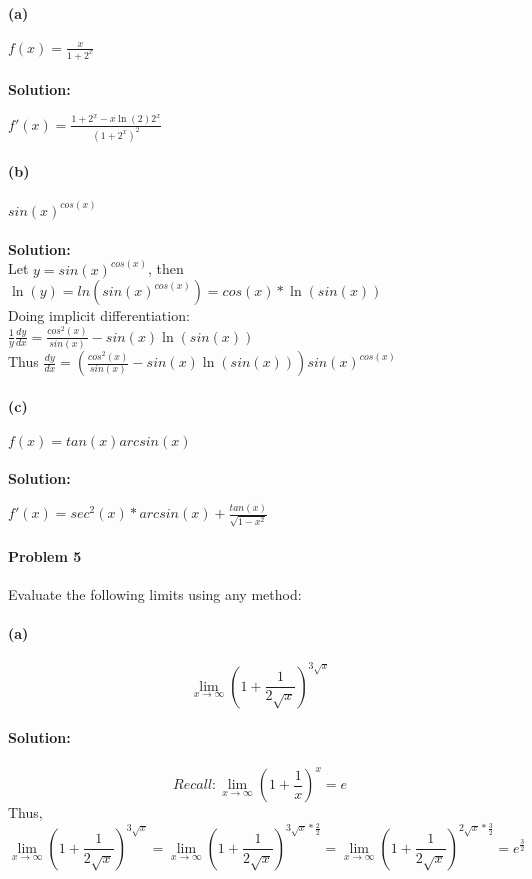 \documentclass[a4paper,11pt]{article}
\begin{document}
\paragraph{(a)}
$f(x) = \frac{x}{1+2^x}$ \\ \\
\textbf{Solution:}
\begin{center}$f ' (x) = \frac{1+2^x - x\ln(2)2^x}{(1+2^x)^2}$\end{center}

\paragraph{(b)} $sin(x)^{cos(x)}$ \\ \\
\textbf{Solution:} \\
Let $y = sin(x)^{cos(x)}$, then \\
$\ln(y) = ln(sin(x)^{cos(x)}) = cos(x)*\ln(sin(x))$ \\
Doing implicit differentiation: \\
$\frac{1}{y}\frac{dy}{dx} = \frac{cos^2(x)}{sin(x)} - sin(x)\ln(sin(x))$ \\
Thus $\frac{dy}{dx} = \left( \frac{cos^2(x)}{sin(x)} - sin(x)\ln(sin(x))\right) sin(x)^{cos(x)}$

\paragraph{(c)} $f(x) = tan(x)arcsin(x)$ \\ \\
\textbf{Solution:}
\begin{center}$f ' (x) = sec^2(x)*arcsin(x) +
\frac{tan(x)}{\sqrt{1-x^2}}$\end{center}

\paragraph{Problem 5} Evaluate the following limits using any method:
\paragraph{(a)}
\begin{displaymath}
\lim_{x \to \infty} \left( 1 +\frac{1}{2\sqrt{x}}\right)^{3\sqrt{x}}
\end{displaymath}

\paragraph{Solution:}
\begin{displaymath}
Recall: \lim_{x \to \infty} \left( 1 +\frac{1}{x}\right)^x = e
\end{displaymath}
Thus, \\
\begin{displaymath}
\lim_{x \to \infty} \left( 1 +\frac{1}{2\sqrt{x}}\right)^{3\sqrt{x}} = 
\lim_{x \to \infty} \left( 1 +\frac{1}{2\sqrt{x}}\right)^{3\sqrt{x} * \frac{2}{2}} = 
\lim_{x \to \infty} \left( 1 +\frac{1}{2\sqrt{x}}\right)^{2\sqrt{x} * \frac{3}{2}} = e^{\frac{3}{2}}
\end{displaymath}
\end{document}
